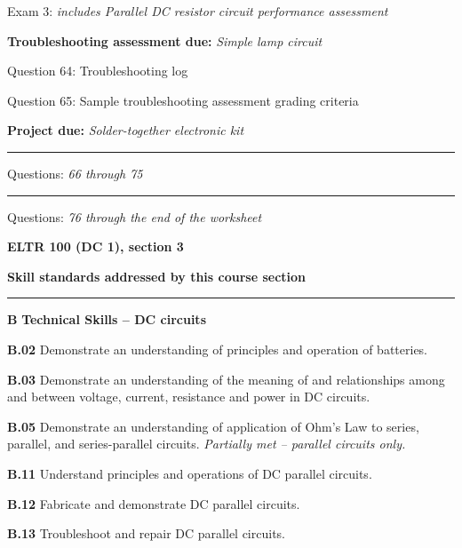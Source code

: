 \hskip 10pt Exam 3: {\it includes Parallel DC resistor circuit performance assessment}
 
\hskip 10pt {\bf Troubleshooting assessment due:} {\it Simple lamp circuit}
 
\hskip 10pt Question 64: Troubleshooting log
 
\hskip 10pt Question 65: Sample troubleshooting assessment grading criteria
 
\hskip 10pt {\bf Project due:} {\it Solder-together electronic kit}
 
\vskip 10pt
\hrule \vskip 5pt
\noindent
{}

\hskip 10pt Questions: {\it 66 through 75}
 
\vskip 10pt
\hrule \vskip 5pt
\noindent
{}

\hskip 10pt Questions: {\it 76 through the end of the worksheet}
 
\vskip 10pt





\vfil \eject

\centerline{\bf ELTR 100 (DC 1), section 3} \bigskip 
 
\vskip 10pt

\noindent
{\bf Skill standards addressed by this course section}

\vskip 5pt

\hrule \vskip 10pt
\noindent
{}

\vskip 5pt

\medskip
\item{\bf B} {\bf Technical Skills -- DC circuits}
\item{\bf B.02} Demonstrate an understanding of principles and operation of batteries.
\item{\bf B.03} Demonstrate an understanding of the meaning of and relationships among and between voltage, current, resistance and power in DC circuits.
\item{\bf B.05} Demonstrate an understanding of application of Ohm's Law to series, parallel, and series-parallel circuits.  {\it Partially met -- parallel circuits only.}
\item{\bf B.11} Understand principles and operations of DC parallel circuits.
\item{\bf B.12} Fabricate and demonstrate DC parallel circuits.
\item{\bf B.13} Troubleshoot and repair DC parallel circuits.
\medskip

